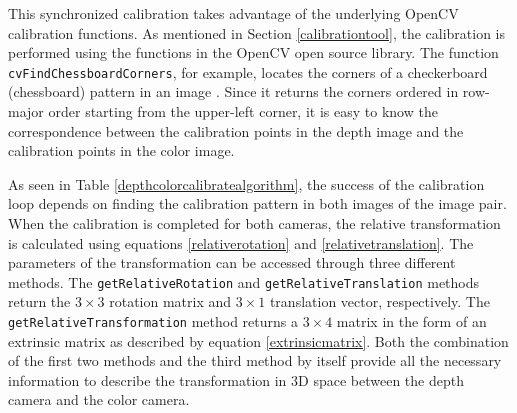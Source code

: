 This synchronized calibration takes advantage of the underlying OpenCV calibration functions. As mentioned in 
Section \ref{calibrationtool}, the calibration is performed using the functions in the OpenCV open source library. 
The function \texttt{cv\-Find\-Chess\-board\-Cor\-ners}, for example, locates the corners of a checkerboard 
(chessboard) pattern in an image \cite{Bradski}. Since it returns the corners ordered in row-major order 
starting from the upper-left corner, it is easy to know the correspondence between the calibration points 
in the depth image and the calibration points in the color image. 

As seen in Table \ref{depthcolorcalibratealgorithm}, the success of the calibration loop depends on finding the 
calibration pattern in both images of the image pair. When the calibration is completed for both
cameras, the relative transformation is calculated using equations \eqref{relativerotation} and 
\eqref{relativetranslation}. The parameters of the transformation can be accessed through three different 
methods. The \texttt{get\-Rel\-a\-tive\-Ro\-ta\-tion} and \texttt{get\-Rel\-a\-tive\-Trans\-la\-tion} methods return 
the $3 \times 3$ rotation matrix and $3 \times 1$ translation vector, respectively. The 
\texttt{get\-Rel\-a\-tive\-Trans\-for\-ma\-tion} method returns a $3 \times 4$ matrix in the form of an extrinsic 
matrix as described by equation \eqref{extrinsicmatrix}. Both the combination of the first two methods and the 
third method by itself provide all the necessary information to describe the transformation in 3D space between 
the depth camera and the color camera.
